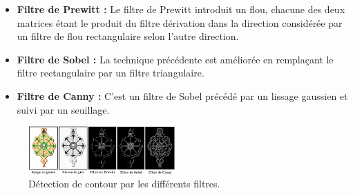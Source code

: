 \begin{itemize}
	\item \textbf{Filtre de Prewitt :}
	Le filtre de Prewitt introduit un flou, chacune des deux matrices étant le produit du filtre dérivation dans la direction considérée par un filtre de flou	rectangulaire selon l'autre direction.
	
	\item \textbf{Filtre de Sobel :}
	La technique précédente est améliorée en remplaçant le filtre rectangulaire par un filtre triangulaire.
	
	\item \textbf{Filtre de Canny :}
	C’est un filtre de Sobel précédé par un lissage gaussien et suivi par un seuillage. 
	
\end{itemize}
\begin{figure}[H]
	\centering
	\includegraphics[width=0.5\textwidth]{Figures/conrour} 
	\caption{Détection de contour par les différents filtres.}
\end{figure}

